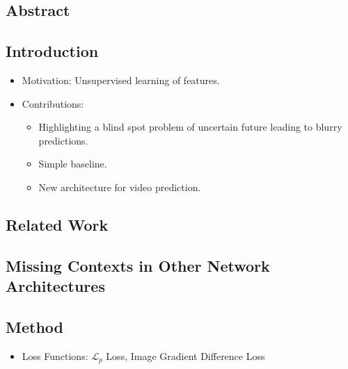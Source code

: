 \documentclass{article}
\begin{document}
    \subsection*{Abstract}

    \subsection{Introduction}\label{subsec:ContextVP_Fully_Context_Aware_Video_Prediction:introduction}
    \begin{itemize}
        \item Motivation: Unsupervised learning of features.
        \item Contributions:
        \begin{itemize}
            \item Highlighting a blind spot problem of uncertain future leading to blurry predictions.
            \item Simple baseline.
            \item New architecture for video prediction.
        \end{itemize}
    \end{itemize}

    \subsection{Related Work}\label{subsec:ContextVP_Fully_Context_Aware_Video_Prediction:related-work}

    \subsection{Missing Contexts in Other Network Architectures}\label{subsec:ContextVP_Fully_Context_Aware_Video_Prediction:missing-contexts-in-other-network-architectures}

    \subsection{Method}\label{subsec:ContextVP_Fully_Context_Aware_Video_Prediction:method}
    \begin{itemize}
        \item Loss Functions: $\mathcal{L}_p$ Loss, Image Gradient Difference Loss
    \end{itemize}
\end{document}
